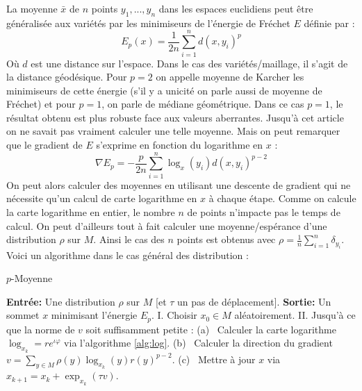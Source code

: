 \documentclass[11pt]{article}
\begin{document}
	La moyenne $\bar{x}$ de $n$ points $y_1, ..., y_n$ dans les espaces euclidiens peut être généralisée aux variétés par les minimiseurs de l'énergie de Fréchet $E$ définie par :
	$$ E_p(x) = \frac{1}{2n} \sum_{i=1}^n d(x, y_i)^p $$
	Où $d$ est une distance sur l'espace. Dans le cas des variétés/maillage, il s'agit de la distance géodésique. Pour $p=2$ on appelle moyenne de Karcher les minimiseurs de cette énergie (s'il y a unicité on parle aussi de moyenne de Fréchet) et pour $p=1$, on parle de médiane géométrique. Dans ce cas $p = 1$, le résultat obtenu est plus robuste face aux valeurs aberrantes. Jusqu'à cet article on ne savait pas vraiment calculer une telle moyenne. Mais on peut remarquer que le gradient de $E$ s'exprime en fonction du logarithme en $x$ :
	$$ \nabla E_p = - \frac{p}{2n} \sum_{i=1}^n \log_x(y_i) d(x, y_i)^{p-2} $$
	On peut alors calculer des moyennes en utilisant une descente de gradient qui ne nécessite qu'un calcul de carte logarithme en $x$ à chaque étape. Comme on calcule la carte logarithme en entier, le nombre $n$ de points n'impacte pas le temps de calcul. On peut d'ailleurs tout à fait calculer une moyenne/espérance d'une distribution $\rho$ sur $M$. Ainsi le cas des $n$ points est obtenus avec $\rho = \frac{1}{n} \sum_{i=1}^n \delta_{y_i}$. Voici un algorithme dans le cas général des distribution :
	\begin{algorithm}[h]
		\caption{$p$-Moyenne}
		\label{alg:moy}
		\begin{algorithmic}
			\State \textbf{Entrée:} Une distribution $\rho$ sur $M$ [et $\tau$ un pas de déplacement].
			\State \textbf{Sortie:} Un sommet $x$ minimisant l'énergie $E_p$.
			\State \hspace{7pt} I. \; Choisir $x_0 \in M$ aléatoirement.
			\State \hspace{3pt} II. \; Jusqu'à ce que la norme de $v$ soit suffisamment petite :
			\State \hspace{16pt} (a) \, Calculer la carte logarithme $\log_{x_k} = r e^{\iota \varphi}$ via l'algorithme \ref{alg:log}.
			\State \hspace{16pt} (b) \, Calculer la direction du gradient $v = \sum_{y \in M} \rho(y) \log_{x_k}(y) r(y)^{p-2}$.
			\State \hspace{16pt} (c) \, Mettre à jour $x$ via $x_{k+1} = x_k + \exp_{x_k}(\tau v)$.
		\end{algorithmic}
	\end{algorithm}
\end{document}

